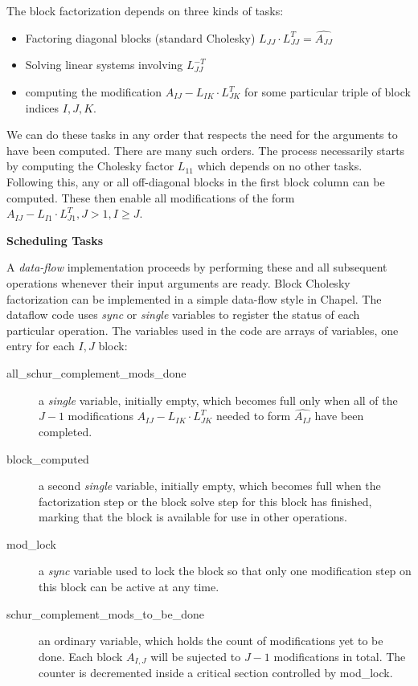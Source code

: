 \documentclass[12pt]{article}
\begin{document}
The block factorization depends on three kinds of tasks:
\begin{itemize}
\item Factoring diagonal blocks (standard Cholesky)
  $L_{JJ} \cdot L_{JJ}^T = \widehat{A_{JJ}}$
\item Solving linear systems involving $L_{JJ}^{-T}$
\item computing the modification $A_{IJ} - L_{IK} \cdot L_{JK}^T$ for some
  particular triple of block indices $I, J, K$.
\end{itemize}
We can do these tasks in any order that respects the need for the arguments to
have been computed.  There are many such orders.  The process necessarily starts
by computing the Cholesky factor $L_{11}$ which depends on no other tasks.
Following this, any or all off-diagonal blocks in the first block column can be
computed.  These then enable all modifications of the form $A_{IJ} - L_{I1}
\cdot L_{J1}^T, J > 1, I \ge J$.

{\large \bf Scheduling Tasks}

A \emph{data-flow} implementation proceeds by performing these and all
subsequent operations whenever their input arguments are ready.  Block Cholesky
factorization can be implemented in a simple data-flow style in Chapel.  The
dataflow code uses \emph{sync} or \emph{single} variables to register the status
of each particular operation.  The variables used in the code are arrays of
variables, one entry for each $I,J$ block:
\begin{description}
  \item [all\_schur\_complement\_mods\_done ] a \emph{single} variable, initially
    empty, which becomes full only when all of the $J-1$ modifications $A_{IJ} -
    L_{IK} \cdot L_{JK}^T$ needed to form $\widehat{A_{IJ}}$ have been
    completed.

  \item [block\_computed] a second \emph{single} variable, initially empty, which
    becomes full when the factorization step or the block solve step for this
    block has finished, marking that the block is available for use in other
    operations.

    \item [mod\_lock] a \emph{sync} variable used to lock the block so that only one
      modification step on this block can be active at any time.

    \item [schur\_complement\_mods\_to\_be\_done] an ordinary variable, which
      holds the count of modifications yet to be done.  Each block $A_{I,J}$
      will be sujected to $J-1$ modifications in total.  The counter is
      decremented inside a critical section controlled by mod\_lock.
\end{description}
\end{document}
